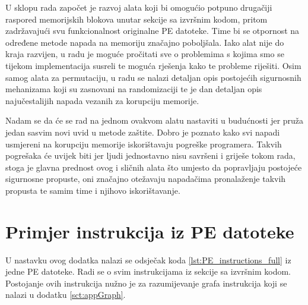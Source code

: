 \documentclass[times, utf8, diplomski, numeric]{fer}
\begin{document}
U sklopu rada započet je razvoj alata koji bi omogućio potpuno
drugačiji raspored memorijskih blokova unutar sekcije sa izvršnim
kodom, pritom zadržavajući svu funkcionalnost originalne PE
datoteke. Time bi se otpornost na određene metode napada na
memoriju značajno poboljšala. Iako alat nije do kraja razvijen, u
radu je moguće pročitati sve o problemima s kojima smo se tijekom
implementacija susreli te moguća rješenja kako te probleme
riješiti. Osim samog alata za permutaciju, u radu se nalazi
detaljan opis postojećih sigurnosnih mehanizama koji su zasnovani
na randomizaciji te je dan detaljan opis najučestalijih napada
vezanih za korupciju memorije.

Nadam se da će se rad na jednom ovakvom alatu nastaviti u
budućnosti jer pruža jedan sasvim novi uvid u metode zaštite.
Dobro je poznato kako svi napadi usmjereni na korupciju memorije
iskorištavaju pogreške programera. Takvih pogrešaka će uvijek
biti jer ljudi jednostavno nisu savršeni i griješe tokom rada,
stoga je glavna prednost ovog i sličnih alata što umjesto da
popravljaju postojeće sigurnosne propuste, oni značajno otežavaju
napadačima pronalaženje takvih propusta te samim time i njihovo
iskorištavanje.


\nocite{*}


\appendix

\chapter{Primjer instrukcija iz PE datoteke}
\label{sct:appPE}

U nastavku ovog dodatka nalazi se odsječak koda
\ref{lst:PE_instructions_full} iz jedne PE datoteke. Radi se o
svim instrukcijama iz sekcije sa izvršnim kodom. Postojanje ovih
instrukcija nužno je za razumijevanje grafa instrukcija koji se
nalazi u dodatku \ref{sct:appGraph}.
\end{document}
